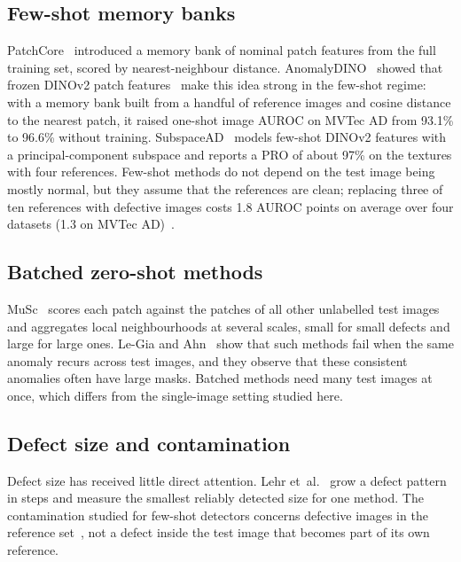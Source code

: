 \subsection{Few-shot memory banks}
PatchCore~\cite{roth2022patchcore} introduced a memory bank of nominal patch
features from the full training set, scored by nearest-neighbour distance. AnomalyDINO~\cite{damm2025anomalydino}
showed that frozen DINOv2 patch features~\cite{oquab2024dinov2} make this
idea strong in the few-shot regime: with a memory bank built from a handful
of reference images and cosine distance to the nearest patch, it raised
one-shot image AUROC on MVTec AD from 93.1\% to 96.6\% without training.
SubspaceAD~\cite{lendering2026subspacead} models few-shot DINOv2 features
with a principal-component subspace and reports a PRO of about 97\% on the
textures with four references. Few-shot methods do not depend on the test
image being mostly normal, but they assume that the references are clean;
replacing three of ten references with defective images costs 1.8 AUROC points on average over four datasets (1.3 on MVTec AD)~\cite{villanueva2026cleaning}.

\subsection{Batched zero-shot methods}
MuSc~\cite{li2024musc} scores each patch against the patches of all other
unlabelled test images and aggregates local neighbourhoods at several scales,
small for small defects and large for large ones. Le-Gia and
Ahn~\cite{legia2025consistent} show that such methods fail when the same
anomaly recurs across test images, and they observe that these consistent
anomalies often have large masks. Batched methods need many test images at
once, which differs from the single-image setting studied here.

\subsection{Defect size and contamination}
Defect size has received little direct attention. Lehr
et~al.~\cite{lehr2024limitations} grow a defect pattern in steps and
measure the smallest reliably detected size for one method. The
contamination studied for few-shot detectors concerns defective images in
the reference set~\cite{villanueva2026cleaning}, not a defect inside the
test image that becomes part of its own reference.

